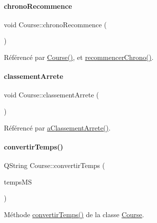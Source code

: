 \paragraph{\texorpdfstring{chrono\+Recommence}{chronoRecommence}}
{\footnotesize\ttfamily void Course\+::chrono\+Recommence (\begin{DoxyParamCaption}{ }\end{DoxyParamCaption})\hspace{0.3cm}{\ttfamily [signal]}}



Référencé par \hyperlink{class_course_af6317ecab95f8a2eb205b4f91b530992}{Course()}, et \hyperlink{class_course_addeae907c4bc0a268f51479041de389c}{recommencer\+Chrono()}.

\mbox{\label{class_course_a630aea833dccd20e52ada1548c334c78}} 
\paragraph{\texorpdfstring{classement\+Arrete}{classementArrete}}
{\footnotesize\ttfamily void Course\+::classement\+Arrete (\begin{DoxyParamCaption}{ }\end{DoxyParamCaption})\hspace{0.3cm}{\ttfamily [signal]}}



Référencé par \hyperlink{class_course_a43696137587262b721767f6113621772}{a\+Classement\+Arrete()}.

\mbox{\label{class_course_ab98bbd1a92e468df7b8b45bb7877afef}} 
\paragraph{\texorpdfstring{convertir\+Temps()}{convertirTemps()}}
{\footnotesize\ttfamily Q\+String Course\+::convertir\+Temps (\begin{DoxyParamCaption}\item[{Q\+String}]{temps\+MS }\end{DoxyParamCaption})}



Méthode \hyperlink{class_course_ab98bbd1a92e468df7b8b45bb7877afef}{convertir\+Temps()} de la classe \hyperlink{class_course}{Course}. 

